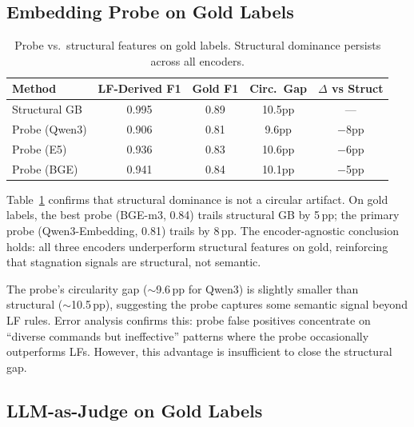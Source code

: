 \documentclass[11pt,a4paper]{article}
\begin{document}
\subsection{Embedding Probe on Gold Labels}

\begin{table}[t]
\centering
\small
\begin{tabular}{lcccc}
\toprule
Method & LF-Derived F1 & Gold F1 & Circ.\ Gap & $\Delta$ vs Struct \\
\midrule
Structural GB & 0.995 & 0.89 & 10.5pp & --- \\
Probe (Qwen3) & 0.906 & 0.81 & 9.6pp & $-$8pp \\
Probe (E5) & 0.936 & 0.83 & 10.6pp & $-$6pp \\
Probe (BGE) & 0.941 & 0.84 & 10.1pp & $-$5pp \\
\bottomrule
\end{tabular}
\caption{Probe vs.\ structural features on gold labels. Structural dominance persists across all encoders.}
\label{tab:probe-gold}
\end{table}

Table~\ref{tab:probe-gold} confirms that structural dominance is not a circular artifact.
On gold labels, the best probe (BGE-m3, 0.84) trails structural GB by 5\,pp; the primary probe (Qwen3-Embedding, 0.81) trails by 8\,pp.
The encoder-agnostic conclusion holds: all three encoders underperform structural features on gold, reinforcing that stagnation signals are structural, not semantic.

The probe's circularity gap ($\sim$9.6\,pp for Qwen3) is slightly smaller than structural ($\sim$10.5\,pp), suggesting the probe captures some semantic signal beyond LF rules.
Error analysis confirms this: probe false positives concentrate on ``diverse commands but ineffective'' patterns where the probe occasionally outperforms LFs.
However, this advantage is insufficient to close the structural gap.

\subsection{LLM-as-Judge on Gold Labels}
\end{document}
